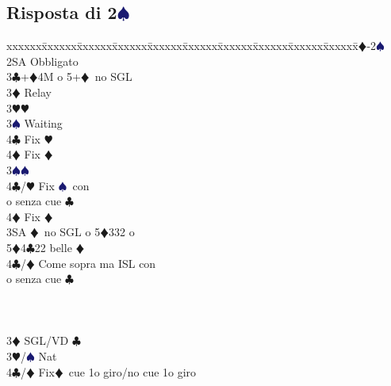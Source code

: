 \documentclass[a4paper,italian]{article}
\newcommand{\BC}{\textcolor{OliveGreen}{$\clubsuit$}}
\newcommand{\BD}{\textcolor{RedOrange}{$\vardiamondsuit$}}
\newcommand{\BH}{\textcolor{Red2}{$\varheartsuit${}}}
\newcommand{\BS}{\textcolor{MidnightBlue}{$\spadesuit${}}}
\newcommand{\pdfs}{\texorpdfstring{\BS{}}{S}}
\newenvironment{bidtable}
{\begin{tabbing}

    xxxxxx\=xxxxxx\=xxxxxx\=xxxxxx\=xxxxxx\=xxxxxx\=xxxxxx\=xxxxxx\=xxxxxx\=xxxxxx\=\kill}
{\end{tabbing} }%
\begin{document}
                                    \subsection{Risposta di 2\pdfs}
                                    \begin{multicols}{2}


                                        \begin{bidtable}
                                            1\BD-2\BS\+\\
                                            2SA \> Obbligato\+\\
                                            3\BC {}+\BD 4M o 5+\BD\ no SGL\+\\
                                            3\BD \> Relay\+\\
                                            3\BH {}\BH \+\\
                                            3\BS \> Waiting\\
                                            4\BC \> Fix \BH \\
                                            4\BD \> Fix \BD \-\\
                                            3\BS {}\BS \+\\
                                            4\BC/\BH \> Fix \BS\ con \+\\
                                            o senza cue \BC \-\\
                                            4\BD \> Fix \BD \-\\
                                            3SA \BD\ no SGL o 5\BD 332 o\+\\ 5\BD 4\BC 22 belle \BD\-\\
                                            4\BC/\BD \> Come sopra ma ISL con\+\\o senza cue \BC\-\-\-\\
                                            \\
                                            \\
                                            \\
                                            3\BD \> SGL/VD \BC \+\\
                                            3\BH/\BS \> Nat\\
                                            4\BC/\BD \> Fix\BD\ cue 1o giro/no cue 1o giro\-\\

\end{bidtable}
\end{multicols}
\end{document}

